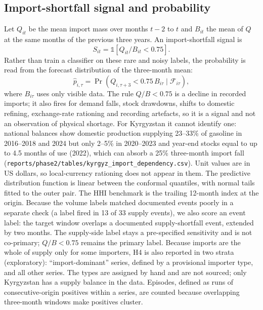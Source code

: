 \documentclass[conference]{IEEEtran}
\newcommand{\ind}{\mathbb{1}}
\begin{document}
\subsection{Import-shortfall signal and probability}
Let $Q_{it}$ be the mean import mass over months $t-2$ to $t$ and $B_{it}$ the mean of $Q$ at the same months of the previous three years. An import-shortfall signal is
\begin{equation}
S_{it}=\ind\left[Q_{it}/B_{it}<0.75\right].
\end{equation}
Rather than train a classifier on these rare and noisy labels, the probability is read from the forecast distribution of the three-month mean:
\begin{equation}
\hat p_{i,\tau}=\Pr\!\left(Q_{i,\tau+3}<0.75\,B_{i\tau}\mid\mathcal{F}_{i\tau}\right),
\end{equation}
where $B_{i\tau}$ uses only visible data. The rule $Q/B<0.75$ is a decline in recorded imports; it also fires for demand falls, stock drawdowns, shifts to domestic refining, exchange-rate rationing and recording artefacts, so it is a signal and not an observation of physical shortage. For Kyrgyzstan it cannot identify one: national balances show domestic production supplying 23--33\% of gasoline in 2016--2018 and 2024 but only 2--5\% in 2020--2023 and year-end stocks equal to up to 4.5 months of use (2022), which can absorb a 25\% three-month import fall (\texttt{reports/phase2/tables/kyrgyz\_import\_dependency.csv}). Unit values are in US dollars, so local-currency rationing does not appear in them. The predictive distribution function is linear between the conformal quantiles, with normal tails fitted to the outer pair. The HHI benchmark is the trailing 12-month index at the origin. Because the volume labels matched documented events poorly in a separate check (a label fired in 13 of 33 supply events), we also score an event label: the target window overlaps a documented supply-shortfall event, extended by two months. The supply-side label stays a pre-specified sensitivity and is not co-primary; $Q/B<0.75$ remains the primary label. Because imports are the whole of supply only for some importers, H4 is also reported in two strata (exploratory): ``import-dominant'' series, defined by a provisional importer type, and all other series. The types are assigned by hand and are not sourced; only Kyrgyzstan has a supply balance in the data. Episodes, defined as runs of consecutive-origin positives within a series, are counted because overlapping three-month windows make positives cluster.
\end{document}
